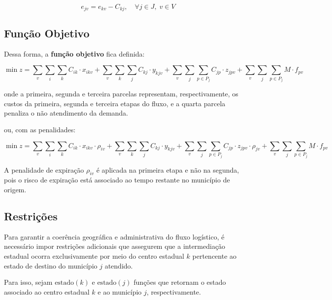 \begin{equation*}
e_{jv} = e_{kv} - C_{kj}, \quad \forall j \in J, \; v \in V
\end{equation*}


\subsection{Função Objetivo}

Dessa forma, a \textbf{função objetivo} fica definida:

\begin{equation}
\min z =
\sum_{v} \sum_{i} \sum_{k} C_{ik} \cdot x_{ikv}
+
\sum_{v} \sum_{k} \sum_{j} C_{kj} \cdot y_{kjv}
+
\sum_{v} \sum_{j} \sum_{p \in P_j} C_{jp} \cdot z_{jpv}
+
\sum_{v} \sum_{j} \sum_{p \in P_j} M \cdot f_{pv}
\label{com_intermediacao_estadual_sem_penalidade}
\end{equation}

onde a primeira, segunda e terceira parcelas representam, respectivamente, os custos da primeira, segunda e terceira etapas do fluxo, e a quarta parcela penaliza o não atendimento da demanda.

ou, com as penalidades:

\begin{equation}
\min z =
\sum_{v} \sum_{i} \sum_{k} C_{ik} \cdot x_{ikv} \cdot \rho_{iv}
+
\sum_{v} \sum_{k} \sum_{j} C_{kj} \cdot y_{kjv}
+
\sum_{v} \sum_{j} \sum_{p \in P_j} C_{jp} \cdot z_{jpv} \cdot \rho_{jv}
+
\sum_{v} \sum_{j} \sum_{p \in P_j} M \cdot f_{pv}
\label{sem_intermediacao_estadual_sem_penalidade}
\end{equation}

A penalidade de expiração $\rho_{iv}$ é aplicada na primeira etapa e não na segunda, pois o risco de expiração está associado ao tempo restante no município de origem.

\subsection{Restrições}

Para garantir a coerência geográfica e administrativa do fluxo logístico, é necessário impor restrições adicionais que assegurem que a intermediação estadual ocorra exclusivamente por meio do centro estadual $k$ pertencente ao estado de destino do município $j$ atendido.

Para isso, sejam $\text{estado}(k)$ e $\text{estado}(j)$ funções que retornam o estado associado ao centro estadual $k$ e ao município $j$, respectivamente.

